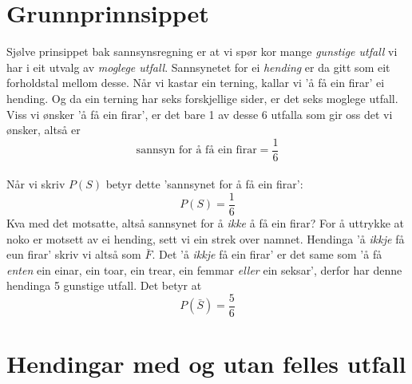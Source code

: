 



\section{Grunnprinnsippet}
Sjølve prinsippet bak sannsynsregning er at vi spør kor mange \textit{gunstige utfall}  vi har i eit utvalg av \textit{moglege utfall}. Sannsynetet for ei \textit{hending} er da gitt som eit forholdstal mellom desse. \regv
{} \vsk
Når vi kastar ein terning, kallar vi 'å få ein firar' ei hending. Og da ein terning har seks forskjellige sider, er det seks moglege utfall.
Viss vi ønsker 'å få ein firar', er det bare 1 av desse 6 utfalla som gir oss det vi ønsker, altså er
\[ \text{sannsyn for å få ein firar}=
 \frac{1}{6} \]
\qquad {} \\[5pt]
Når vi skriv $P(S)$ betyr dette 'sannsynet for å få ein firar':
\[ P(S)=\frac{1}{6} \]
Kva med det motsatte, altså sannsynet for å \textsl{ikke} å få ein firar? For å uttrykke at noko er motsett av ei hending, sett vi ein strek over namnet. Hendinga 'å \textsl{ikkje} få eun firar' skriv vi altså som $ \bar{F} $. Det 'å \textsl{ikkje} få ein firar' er det same som 'å få \textsl{enten} ein einar, ein toar, ein trear, ein femmar \textsl{eller} ein seksar', derfor har denne hendinga 5 gunstige utfall. Det betyr at
\[ P(\bar{S})=\frac{5}{6} \]
 \vsk

\section{Hendingar med og utan felles utfall}
